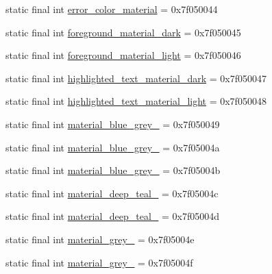 \begin{DoxyCompactItemize}
\item 
static final int \mbox{\hyperlink{classandroid_1_1support_1_1v7_1_1appcompat_1_1_r_1_1color_acda7a2036b7587d6f96eca93fed96ef3}{error\+\_\+color\+\_\+material}} = 0x7f050044
\item 
static final int \mbox{\hyperlink{classandroid_1_1support_1_1v7_1_1appcompat_1_1_r_1_1color_a0e92ea4a646c7265ffc07bb24b37a159}{foreground\+\_\+material\+\_\+dark}} = 0x7f050045
\item 
static final int \mbox{\hyperlink{classandroid_1_1support_1_1v7_1_1appcompat_1_1_r_1_1color_aac4940e503b096bce527e09a156fd673}{foreground\+\_\+material\+\_\+light}} = 0x7f050046
\item 
static final int \mbox{\hyperlink{classandroid_1_1support_1_1v7_1_1appcompat_1_1_r_1_1color_a353827fd67f511ffa13b0841163a5e59}{highlighted\+\_\+text\+\_\+material\+\_\+dark}} = 0x7f050047
\item 
static final int \mbox{\hyperlink{classandroid_1_1support_1_1v7_1_1appcompat_1_1_r_1_1color_af83110813f0593731629ede40790138c}{highlighted\+\_\+text\+\_\+material\+\_\+light}} = 0x7f050048
\item 
static final int \mbox{\hyperlink{classandroid_1_1support_1_1v7_1_1appcompat_1_1_r_1_1color_a7b17af0188db9a6eeddba08a52c2b81e}{material\+\_\+blue\+\_\+grey\+\_}} = 0x7f050049
\item 
static final int \mbox{\hyperlink{classandroid_1_1support_1_1v7_1_1appcompat_1_1_r_1_1color_a94196ea3a71d1fb078c4cfe7fead05ed}{material\+\_\+blue\+\_\+grey\+\_}} = 0x7f05004a
\item 
static final int \mbox{\hyperlink{classandroid_1_1support_1_1v7_1_1appcompat_1_1_r_1_1color_aac3b5a45f073f66668c2786bc024b871}{material\+\_\+blue\+\_\+grey\+\_}} = 0x7f05004b
\item 
static final int \mbox{\hyperlink{classandroid_1_1support_1_1v7_1_1appcompat_1_1_r_1_1color_a9fa713d57229e83e5e8a81ae660895e9}{material\+\_\+deep\+\_\+teal\+\_}} = 0x7f05004c
\item 
static final int \mbox{\hyperlink{classandroid_1_1support_1_1v7_1_1appcompat_1_1_r_1_1color_a91e168c89674f059c16a0bf87e6c0721}{material\+\_\+deep\+\_\+teal\+\_}} = 0x7f05004d
\item 
static final int \mbox{\hyperlink{classandroid_1_1support_1_1v7_1_1appcompat_1_1_r_1_1color_ada094c4cdef10ed8b563632bbc13a2e8}{material\+\_\+grey\+\_}} = 0x7f05004e
\item 
static final int \mbox{\hyperlink{classandroid_1_1support_1_1v7_1_1appcompat_1_1_r_1_1color_a6b86e97d87330195a77f48657aa3753d}{material\+\_\+grey\+\_}} = 0x7f05004f

\end{DoxyCompactItemize}
